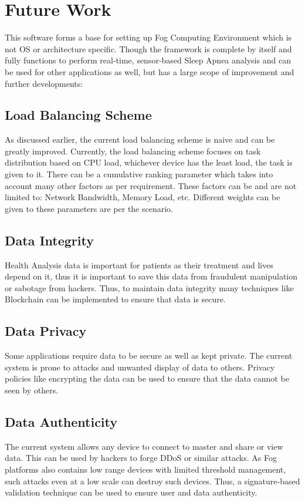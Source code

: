 \documentclass[10pt,journal,compsoc]{IEEEtran}
\begin{document}
\section{Future Work}
This software forms a base for setting up Fog Computing Environment which is not OS or architecture specific. Though the framework is complete by itself and fully functions to perform real-time, sensor-based Sleep Apnea analysis and can be used for other applications as well, but has a large scope of improvement and further developments:

\subsection{Load Balancing Scheme}
As discussed earlier, the current load balancing scheme is naive and can be greatly improved. Currently, the load balancing scheme focuses on task distribution based on CPU load, whichever device has the least load, the task is given to it. There can be a cumulative ranking parameter which takes into account many other factors as per requirement. These factors can be and are not limited to: Network Bandwidth, Memory Load, etc. Different weights can be given to these parameters are per the scenario. 

\subsection{Data Integrity}
Health Analysis data is important for patients as their treatment and lives depend on it, thus it is important to save this data from fraudulent manipulation or sabotage from hackers. Thus, to maintain data integrity many techniques like Blockchain can be implemented to ensure that data is secure. 

\subsection{Data Privacy}
Some applications require data to be secure as well as kept private. The current system is prone to attacks and unwanted display of data to others. Privacy policies like encrypting the data can be used to ensure that the data cannot be seen by others. 

\subsection{Data Authenticity}
The current system allows any device to connect to master and share or view data. This can be used by hackers to forge DDoS or similar attacks. As Fog platforms also contains low range devices with limited threshold management, such attacks even at a low scale can destroy such devices. Thus, a signature-based validation technique can be used to ensure user and data authenticity.
\end{document}
